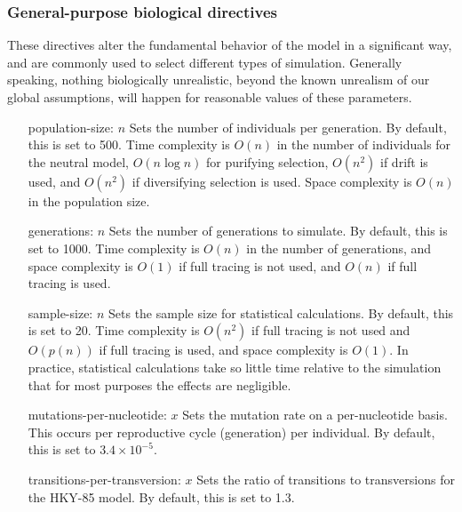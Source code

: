 \documentclass{article}
\begin{document}
      \subsubsection{General-purpose biological directives}
        \label{sec:general-directives}

        These directives alter the fundamental behavior of the model in a
        significant way, and are commonly used to select different types of
        simulation. Generally speaking, nothing biologically unrealistic, beyond
        the known unrealism of our global assumptions, will happen for
        reasonable values of these parameters.

        \begin{enumerate}
          \item[population-size: $n$]
          Sets the number of individuals per generation. By default, this is set
          to 500. Time complexity is $O(n)$ in the number of individuals for the
          neutral model, $O(n \log n)$ for purifying selection, $O(n^2)$ if
          drift is used, and $O(n^2)$ if diversifying selection is used. Space
          complexity is $O(n)$ in the population size.

          \item[generations: $n$]
          Sets the number of generations to simulate. By default, this is set to
          1000. Time complexity is $O(n)$ in the number of generations, and
          space complexity is $O(1)$ if full tracing is not used, and $O(n)$ if
          full tracing is used.

          \item[sample-size: $n$]
          Sets the sample size for statistical calculations. By default, this is
          set to 20. Time complexity is $O(n^2)$ if full tracing is not used and
          $O(p(n))$ if full tracing is used, and space complexity is $O(1)$. In
          practice, statistical calculations take so little time relative to the
          simulation that for most purposes the effects are negligible.

          \item[mutations-per-nucleotide: $x$]
          Sets the mutation rate on a per-nucleotide basis. This occurs per
          reproductive cycle (generation) per individual. By default, this is
          set to $3.4 \times 10^{-5}$.

          \item[transitions-per-transversion: $x$]
          Sets the ratio of transitions to transversions for the HKY-85 model.
          By default, this is set to 1.3.


\end{enumerate}
\end{document}
